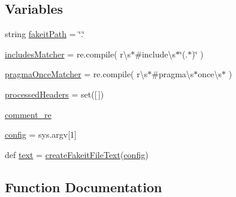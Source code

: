 \subsection*{Variables}
\begin{DoxyCompactItemize}
\item 
string \mbox{\hyperlink{namespacegenerate__fakeit__single__header_aa4b745b10438a939928b07b6872d7691}{fakeit\+Path}} = \char`\"{}.\char`\"{}
\item 
\mbox{\hyperlink{namespacegenerate__fakeit__single__header_a9eff8f76422a3186bf21e76772233fad}{includes\+Matcher}} = re.\+compile( r\textquotesingle{}\textbackslash{}s$\ast$\#include\textbackslash{}s$\ast$\char`\"{}(.$\ast$)\char`\"{}\textquotesingle{} )
\item 
\mbox{\hyperlink{namespacegenerate__fakeit__single__header_a4122af42570381536518e1082d365e02}{pragma\+Once\+Matcher}} = re.\+compile( r\textquotesingle{}\textbackslash{}s$\ast$\#pragma\textbackslash{}s$\ast$once\textbackslash{}s$\ast$\textquotesingle{} )
\item 
\mbox{\hyperlink{namespacegenerate__fakeit__single__header_a2c21ec2d3e729cc74e35aa01cde292c3}{processed\+Headers}} = set(\mbox{[}$\,$\mbox{]})
\item 
\mbox{\hyperlink{namespacegenerate__fakeit__single__header_a0ed06b5d78596a8a4d254080bac4bcfd}{comment\+\_\+re}}
\item 
\mbox{\hyperlink{namespacegenerate__fakeit__single__header_a8bc6420681fec1a1f97812159ea296c2}{config}} = sys.\+argv\mbox{[}1\mbox{]}
\item 
def \mbox{\hyperlink{namespacegenerate__fakeit__single__header_afac367357ef002b78b6d1f310d568c48}{text}} = \mbox{\hyperlink{namespacegenerate__fakeit__single__header_a706bc4d83a52c73779e880efbf2db60c}{create\+Fakeit\+File\+Text}}(\mbox{\hyperlink{namespacegenerate__fakeit__single__header_a8bc6420681fec1a1f97812159ea296c2}{config}})
\end{DoxyCompactItemize}


\subsection{Function Documentation}
\mbox{\label{namespacegenerate__fakeit__single__header_a95906064be1f87939d4725d66dfbdde9}} 
